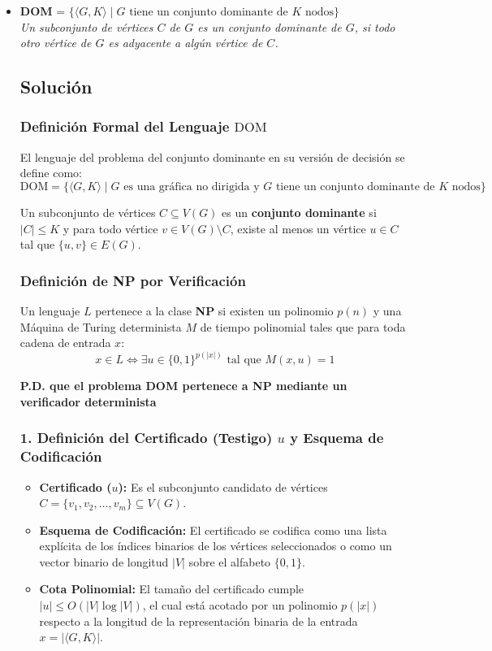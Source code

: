 \begin{itemize}[leftmargin=*]
    \item \textbf{DOM} = $\{ \langle G, K \rangle \mid G \text{ tiene un conjunto dominante de } K \text{ nodos} \}$ \\
    \textit{Un subconjunto de vértices $C$ de $G$ es un conjunto dominante de $G$, si todo otro vértice de $G$ es adyacente a algún vértice de $C$.}
    
    \subsection*{Solución}
    \subsubsection*{Definición Formal del Lenguaje $\text{DOM}$}
    El lenguaje del problema del conjunto dominante en su versión de decisión se define como:
    \[ \text{DOM} = \{ \langle G, K \rangle \mid G \text{ es una gráfica no dirigida y } G \text{ tiene un conjunto dominante de } K \text{ nodos} \} \]

    Un subconjunto de vértices $C \subseteq V(G)$ es un \textbf{conjunto dominante} si $|C| \le K$ y para todo vértice $v \in V(G) \setminus C$, existe al menos un vértice $u \in C$ tal que $\{u, v\} \in E(G)$.

    \subsubsection*{Definición de NP por Verificación}
    Un lenguaje $L$ pertenece a la clase \textbf{NP} si existen un polinomio $p(n)$ y una Máquina de Turing determinista $M$ de tiempo polinomial tales que para toda cadena de entrada $x$:
    \[ x \in L \iff \exists u \in \{0, 1\}^{p(|x|)} \text{ tal que } M(x, u) = 1 \]

    \vspace{0.3cm}
    \noindent\textbf{P.D. que el problema DOM pertenece a NP mediante un verificador determinista}

    \subsubsection*{1. Definición del Certificado (Testigo) $u$ y Esquema de Codificación}
    \begin{itemize}[leftmargin=*]
        \item \textbf{Certificado ($u$):} Es el subconjunto candidato de vértices $C = \{v_1, v_2, \dots, v_m\} \subseteq V(G)$.
        \item \textbf{Esquema de Codificación:} El certificado se codifica como una lista explícita de los índices binarios de los vértices seleccionados o como un vector binario de longitud $|V|$ sobre el alfabeto $\{0, 1\}$.
        \item \textbf{Cota Polinomial:} El tamaño del certificado cumple $|u| \le O(|V| \log |V|)$, el cual está acotado por un polinomio $p(|x|)$ respecto a la longitud de la representación binaria de la entrada $x = |\langle G, K \rangle|$.
    \end{itemize}


\end{itemize}
